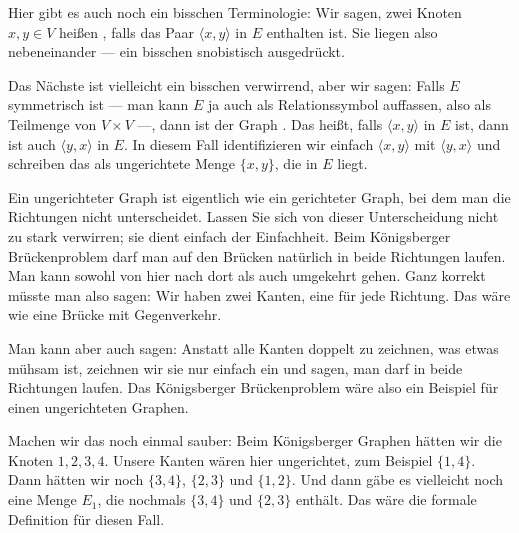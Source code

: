 \begin{math-stroke}
\end{math-stroke}

\begin{spoken-clean}[00:16:52 - 00:20:32]
Hier gibt es auch noch ein bisschen Terminologie: Wir sagen, zwei Knoten $x, y \in V$ heißen , falls das Paar $\langle x, y \rangle$ in $E$ enthalten ist. Sie liegen also nebeneinander --- ein bisschen snobistisch ausgedrückt.

Das Nächste ist vielleicht ein bisschen verwirrend, aber wir sagen: Falls $E$ symmetrisch ist --- man kann $E$ ja auch als Relationssymbol auffassen, also als Teilmenge von $V \times V$ ---, dann ist der Graph . Das heißt, falls $\langle x, y \rangle$ in $E$ ist, dann ist auch $\langle y, x \rangle$ in $E$. In diesem Fall identifizieren wir einfach $\langle x, y \rangle$ mit $\langle y, x \rangle$ und schreiben das als ungerichtete Menge $\{x, y\}$, die in $E$ liegt.

Ein ungerichteter Graph ist eigentlich wie ein gerichteter Graph, bei dem man die Richtungen nicht unterscheidet. Lassen Sie sich von dieser Unterscheidung nicht zu stark verwirren; sie dient einfach der Einfachheit. Beim Königsberger Brückenproblem darf man auf den Brücken natürlich in beide Richtungen laufen. Man kann sowohl von hier nach dort als auch umgekehrt gehen. Ganz korrekt müsste man also sagen: Wir haben zwei Kanten, eine für jede Richtung. Das wäre wie eine Brücke mit Gegenverkehr.

Man kann aber auch sagen: Anstatt alle Kanten doppelt zu zeichnen, was etwas mühsam ist, zeichnen wir sie nur einfach ein und sagen, man darf in beide Richtungen laufen. Das Königsberger Brückenproblem wäre also ein Beispiel für einen ungerichteten Graphen.

Machen wir das noch einmal sauber: Beim Königsberger Graphen hätten wir die Knoten $1, 2, 3, 4$. Unsere Kanten wären hier ungerichtet, zum Beispiel $\{1, 4\}$. Dann hätten wir noch $\{3, 4\}$, $\{2, 3\}$ und $\{1, 2\}$. Und dann gäbe es vielleicht noch eine Menge $E_1$, die nochmals $\{3, 4\}$ und $\{2, 3\}$ enthält. Das wäre die formale Definition für diesen Fall.
\end{spoken-clean}

